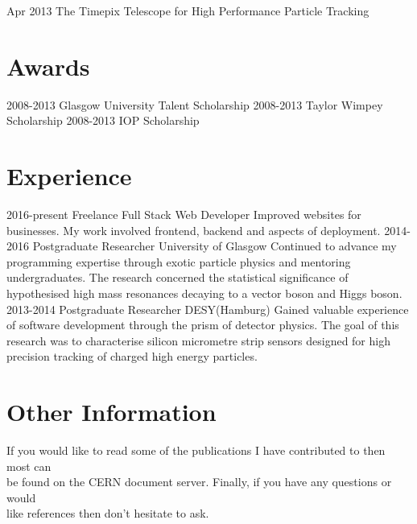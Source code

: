 \documentclass[]{twentysecondcv}
\begin{document}
\begin{twentyshort}
  \twentyitemshort
    {Apr 2013}
    {The Timepix Telescope for High Performance Particle Tracking }
\end{twentyshort}



\section*{Awards}

\begin{twentyshort}
  \twentyitemshort
    {2008-2013}
    {Glasgow University Talent Scholarship }
  \twentyitemshort
    {2008-2013}
    {Taylor Wimpey Scholarship }
  \twentyitemshort
    {2008-2013}
    {IOP Scholarship}
\end{twentyshort}


\section*{Experience}

\begin{twenty}
  \twentyitem
    {2016-present}
    {Freelance Full Stack Web Developer}
    {}
    {Improved websites for businesses. My work involved frontend, backend and aspects of deployment.}
  \twentyitem
    {2014-2016}
    {Postgraduate Researcher}
    {University of Glasgow}
    {Continued to advance my programming expertise through exotic particle physics and mentoring undergraduates.  The research concerned the  statistical significance of hypothesised high mass resonances decaying to a vector boson and Higgs boson.}
\twentyitem
    {2013-2014}
    {Postgraduate Researcher}
		{DESY(Hamburg)}
    {Gained valuable experience of software development through the prism of detector physics.  The goal of this research was to  characterise silicon micrometre strip sensors designed for high precision tracking of charged high energy particles.}

\end{twenty}
\section*{Other Information}
\hspace*{5pt}
If you would like to read some of the publications I have contributed to then most can \\ \hspace*{5pt} be found on the CERN document server. Finally, if you have any questions or would \\ \hspace*{5pt} like references then don't hesitate to ask. \\ 
\hspace*{5pt}
\vspace*{2pt}

\end{document}
